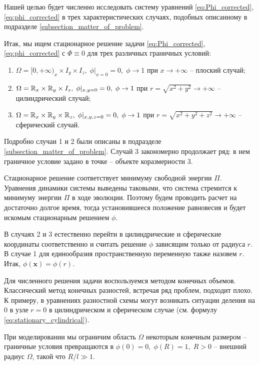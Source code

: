 Нашей целью будет численно исследовать систему уравнений \eqref{eq:Phi_corrected}, \eqref{eq:phi_corrected} в трех характеристических случаях, подобных описанному в подразделе \ref{subsection_matter_of_problem}.

Итак, мы ищем стационарное решение задачи \eqref{eq:Phi_corrected}, \eqref{eq:phi_corrected} с $\Phi \equiv 0$ для трех различных граничных условий:
\begin{enumerate}
    \item $\Omega = [0, +\infty)_x \times I_y \times I_z, \; \phi|_{x = 0} = 0, \; \phi \to 1$ при $x \to +\infty$ -- плоский случай;
    \item $\Omega = {\mathbb{R}}_x \times {\mathbb{R}}_y \times I_z, \; \phi|_{x, y = 0} = 0, \; \phi \to 1$ при $r = \sqrt{x^2 + y^2} \to +\infty$ -- цилиндрический случай;
    \item $\Omega = {\mathbb{R}}_x \times {\mathbb{R}}_y \times {\mathbb{R}}_z, \; \phi|_{x, y, z = 0} = 0, \; \phi \to 1$ при $r = \sqrt{x^2 + y^2 + z^2} \to +\infty$ -- сферический случай.
\end{enumerate}
Подробно случаи 1 и 2 были описаны в подразделе \ref{subsection_matter_of_problem}. Случай 3 закономерно продолжает ряд: в нем граничное условие задано в точке -- объекте коразмерности 3.

Стационарное решение соответствует минимуму свободной энергии $\Pi$. Уравнения динамики системы выведены таковыми, что система стремится к минимуму энергии $\Pi$ в ходе эволюции. Поэтому будем проводить расчет на достаточно долгое время, тогда установившееся положение равновесия и будет искомым стационарным решением $\phi$.

В случаях 2 и 3 естественно перейти в цилиндрические и сферические координаты соответственно и считать решение $\phi$ зависящим только от радиуса $r$. В случае 1 для единообразия пространственную переменную также назовем $r$. Итак, $\phi(\mathbf{x}) = \phi(r)$.

Для численного решения задачи воспользуемся методом конечных объемов. Классический метод конечных разностей, встречая ряд проблем, подходит плохо. К примеру, в уравнениях разностной схемы могут возникать ситуации деления на 0 в узле $r = 0$ в цилиндрическом и сферическом случае (см. формулу \eqref{eq:stationary_cylindrical}).

При моделировании мы ограничим область $\Omega$ некоторым конечным размером -- граничные условия превращаются в $\phi(0) = 0, \; \phi(R) = 1, \; R > 0$ -- внешний радиус $\Omega$, такой что $R / l \gg 1$.

